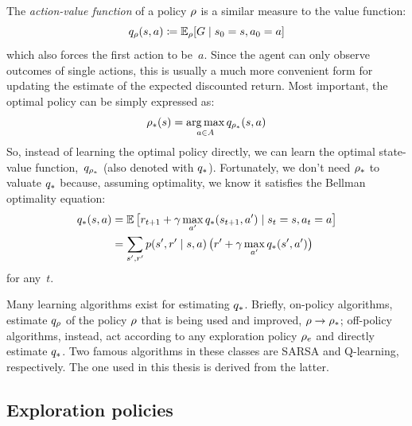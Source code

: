 The \emph{action-value function} of a policy $\rho$ is a similar measure to
the value function:
\begin{equation}
	q_{\rho}(s, a) \coloneqq \mathbb{E}_{\rho}[G \mid s_0 = s, a_0 = a]
\end{equation}
which also forces the first action to be~$a$. Since the agent can only observe
outcomes of single actions, this is usually a much more convenient form for
updating the estimate of the expected discounted return. Most important, the
optimal policy can be simply expressed as:
\begin{equation}
	{\rho}_*(s) = \operatorname*{arg\,max}_{a \in A} q_{{\rho}_*}(s, a)
	\label{eq:opt-policy-q}
\end{equation}
So, instead of learning the optimal policy directly, we can learn the optimal
state-value function,~$q_{{\rho}_*}$ (also denoted with ${q}_*$).
Fortunately, we don't need ${\rho}_*$ to valuate ${q}_*$ because,
assuming optimality, we know it satisfies the Bellman optimality equation:
\begin{align}
	{q}_*(s, a) &= \mathbb{E}\, \bigl[ r_{t+1} + \gamma \max_{a'}
	{q}_*(s_{t+1}, a') \mid s_t = s, a_t = a \bigr] \\
	&= \sum_{s', r'} p(s', r' \mid s, a) \,
	\bigl( r' + \gamma \max_{a'} {q}_*(s', a') \bigr)
	\label{eq:q-bellman}
\end{align}
for any~$t$.

Many learning algorithms exist for estimating ${q}_*$. Briefly, on-policy
algorithms, estimate $q_\rho$ of the policy $\rho$ that is being used
and improved, $\rho \to {\rho}_*$; off-policy algorithms, instead,
act according to any exploration policy $\rho_e$ and directly estimate
${q}_*$.  Two famous algorithms in these classes are SARSA and
Q-learning, respectively.  The one used in this thesis is derived from the
latter.


\subsection{Exploration policies}

